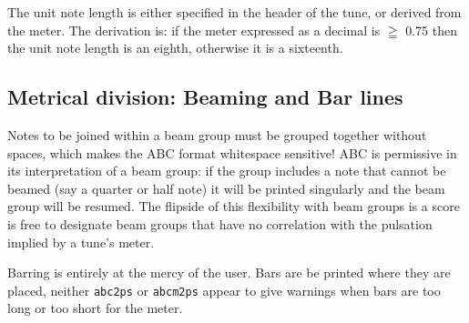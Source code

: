 \documentclass{article}
\begin{document}
The unit note length is either specified in the header of the 
tune, or derived from the meter. The derivation is: 
if the meter expressed as a decimal is $\geqq$ 0.75 then the 
unit note length is an eighth, otherwise it is a sixteenth.

\subsection{Metrical division: Beaming and Bar lines}
Notes to be joined within a beam group must be grouped together
without spaces, which makes the ABC format whitespace sensitive!
ABC is permissive in its interpretation of a beam group: if the 
group includes a note that cannot be beamed (say a quarter or half
note) it will be printed singularly and the beam group will be 
resumed. The flipside of this flexibility with beam groups is a
score is free to designate beam groups that have no correlation  
with the pulsation implied by a tune's meter.

Barring is entirely at the mercy of the user. Bars are be printed 
where they are placed, neither \verb+abc2ps+ or \verb+abcm2ps+ 
appear to give warnings when bars are too long or too short for 
the meter.
\end{document}
